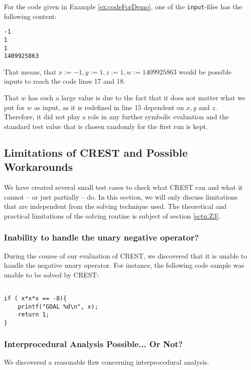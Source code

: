 \documentclass[oribibl]{llncs}
\begin{document}
For the code given in Example \ref{ex:codeForDemo}, one of the \texttt{input}-files has
the following content:
\begin{verbatim}
-1
1
1
1409925863
\end{verbatim}

That means, that $x :=-1, y:=1, z:=1, w:=1409925863$ would be possible
inputs to reach the code lines 17 and 18.

\begin{remark}
That $w$ has such a large
value is due to the fact that it does not matter what we put for $w$
as input, as it is redefined in line 15 dependent on $x,y$ and
$z$. Therefore, it did not play a role in any further symbolic
evaluation and the standard test value that is chosen randomly for the
first run is kept.
\end{remark}

\subsection{Limitations of \textsc{CREST} and Possible Workarounds}

We have created several small test cases to check what CREST can and
what it cannot -- or just partially -- do. In this section, we will only discuss
limitations that are independent from the solving technique used. The
theoretical and practical limitations of the solving routine is subject of section \ref{sctn:Z3}.

\subsubsection{Inability to handle the unary negative operator?}
During the course of our evaluation of CREST, we discovered that it is unable to handle the negative unary operator. For instance, the following code sample was unable to be solved by CREST:

\begin{example}
\label{ex:codeForDemo}
\begin{verbatim}

if ( x*x*x == -8){
    printf("GOAL %d\n", x);
    return 1;
}
\end{verbatim}
\end{example}
\subsubsection{Interprocedural Analysis Possible... Or Not?}

We discovered a reasonable flaw concerning interprocedural analysis.
\end{document}
